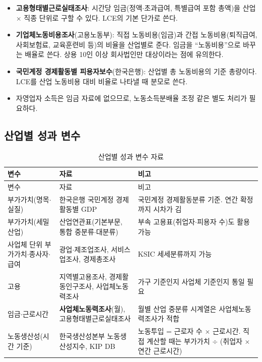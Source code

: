 \documentclass[11pt]{article}
\begin{document}
\begin{itemize}[leftmargin=*]
  \item \textbf{고용형태별근로실태조사}: 시간당 임금(정액$\cdot$초과급여, 특별급여 포함 총액)을 산업 $\times$ 직종 단위로 구할 수 있다. LCE의 기본 단가로 쓴다.
  \item \textbf{기업체노동비용조사}(고용노동부): 직접 노동비용(임금)과 간접 노동비용(퇴직급여, 사회보험료, 교육훈련비 등)의 비율을 산업별로 준다. 임금을 ``노동비용''으로 바꾸는 배율로 쓴다. 상용 10인 이상 회사법인만 대상이라는 점에 유의한다.
  \item \textbf{국민계정 경제활동별 피용자보수}(한국은행): 산업별 총 노동비용의 기준 총량이다. LCE를 산업 노동비용 대비 비율로 나타낼 때 분모로 쓴다.
  \item 자영업자 소득은 임금 자료에 없으므로, 노동소득분배율 조정 같은 별도 처리가 필요하다.
\end{itemize}

\subsection{산업별 성과 변수}

\begin{longtable}{L{3.4cm}L{6.2cm}L{6.4cm}}
\caption{산업별 성과 변수 자료}\label{tab:outcome}\\
\toprule
변수 & 자료 & 비고 \\
\midrule
\endfirsthead
\toprule
변수 & 자료 & 비고 \\
\midrule
\endhead
부가가치(명목$\cdot$실질) & 한국은행 국민계정 경제활동별 GDP & 국민계정 경제활동분류 기준. 연간 확정까지 시차가 김 \\
부가가치(세밀 산업) & 산업연관표(기본부문, 통합 중분류$\cdot$대분류) & 부속 고용표(취업자$\cdot$피용자 수)도 활용 가능 \\
사업체 단위 부가가치$\cdot$종사자$\cdot$급여 & 광업$\cdot$제조업조사, 서비스업조사, 경제총조사 & KSIC 세세분류까지 가능 \\
고용 & 지역별고용조사, 경제활동인구조사, 사업체노동력조사 & 가구 기준인지 사업체 기준인지 통일 필요 \\
임금$\cdot$근로시간 & \textbf{사업체노동력조사}(월), 고용형태별근로실태조사 & 월별 산업 중분류 시계열은 사업체노동력조사가 적합 \\
노동생산성(시간 기준) & 한국생산성본부 노동생산성지수, KIP DB & 노동투입 = 근로자 수 $\times$ 근로시간. 직접 계산할 때는 부가가치 $\div$ (취업자 $\times$ 연간 근로시간) \\
\bottomrule
\end{longtable}
\end{document}
